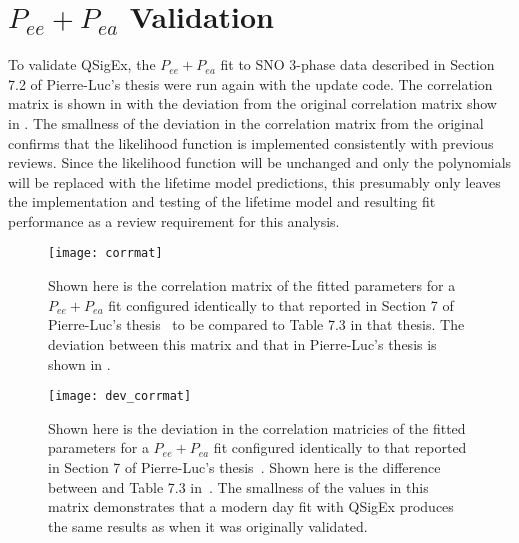 \section{$P_{ee} + P_{ea}$ Validation}

To validate QSigEx, the $P_{ee} + P_{ea}$ fit to SNO 3-phase data described in Section 7.2 of Pierre-Luc's thesis were run again with the update code. The correlation matrix is shown in  with the deviation from the original correlation matrix show in . The smallness of the deviation in the correlation matrix from the original confirms that the likelihood function is implemented consistently with previous reviews. Since the likelihood function will be unchanged and only the polynomials will be replaced with the lifetime model predictions, this presumably only leaves the implementation and testing of the lifetime model and resulting fit performance as a review requirement for this analysis. 

\begin{figure}
\centering
\texttt{[image: corrmat]} \\
\caption{
Shown here is the correlation matrix of the fitted parameters for a $P_{ee} + P_{ea}$ fit configured identically to that reported in Section 7 of Pierre-Luc's thesis~\cite{plthesis} to be compared to Table 7.3 in that thesis. The deviation between this matrix and that in Pierre-Luc's thesis is shown in .
}
\label{fig:qsigex_pee_pea_fits}
\end{figure}

\begin{figure}
\centering
\texttt{[image: dev\_corrmat]} \\
\caption{
Shown here is the deviation in the correlation matricies of the fitted parameters for a $P_{ee} + P_{ea}$ fit configured identically to that reported in Section 7 of Pierre-Luc's thesis~\cite{plthesis}. Shown here is the difference between  and Table 7.3 in~\cite{plthesis}. The smallness of the values in this matrix demonstrates that a modern day fit with QSigEx produces the same results as when it was originally validated.
}
\label{fig:qsigex_pee_pea_fits_dev}
\end{figure}
